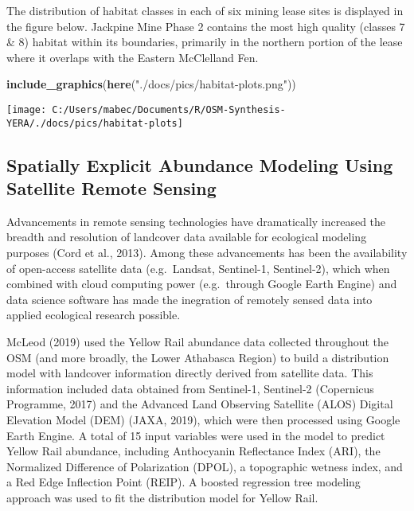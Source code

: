 \documentclass[11pt,]{article}
\newenvironment{Shaded}{\begin{snugshade}}{\end{snugshade}}
\newcommand{\KeywordTok}[1]{\textcolor[rgb]{0.13,0.29,0.53}{\textbf{#1}}}
\newcommand{\StringTok}[1]{\textcolor[rgb]{0.31,0.60,0.02}{#1}}
\newcommand{\NormalTok}[1]{#1}
\begin{document}
The distribution of habitat classes in each of six mining lease sites is
displayed in the figure below. Jackpine Mine Phase 2 contains the most
high quality (classes 7 \& 8) habitat within its boundaries, primarily
in the northern portion of the lease where it overlaps with the Eastern
McClelland Fen.

\begin{Shaded}
\begin{Highlighting}[]
\KeywordTok{include_graphics}\NormalTok{(}\KeywordTok{here}\NormalTok{(}\StringTok{"./docs/pics/habitat-plots.png"}\NormalTok{))}
\end{Highlighting}
\end{Shaded}

\begin{center}\texttt{[image: C:/Users/mabec/Documents/R/OSM-Synthesis-YERA/./docs/pics/habitat-plots]} \end{center}

\subsection{Spatially Explicit Abundance Modeling Using Satellite Remote
Sensing}\label{spatially-explicit-abundance-modeling-using-satellite-remote-sensing}

Advancements in remote sensing technologies have dramatically increased
the breadth and resolution of landcover data available for ecological
modeling purposes (Cord et al., 2013). Among these advancements has been
the availability of open-access satellite data (e.g.~Landsat,
Sentinel-1, Sentinel-2), which when combined with cloud computing power
(e.g.~through Google Earth Engine) and data science software has made
the inegration of remotely sensed data into applied ecological research
possible.

McLeod (2019) used the Yellow Rail abundance data collected throughout
the OSM (and more broadly, the Lower Athabasca Region) to build a
distribution model with landcover information directly derived from
satellite data. This information included data obtained from Sentinel-1,
Sentinel-2 (Copernicus Programme, 2017) and the Advanced Land Observing
Satellite (ALOS) Digital Elevation Model (DEM) (JAXA, 2019), which were
then processed using Google Earth Engine. A total of 15 input variables
were used in the model to predict Yellow Rail abundance, including
Anthocyanin Reflectance Index (ARI), the Normalized Difference of
Polarization (DPOL), a topographic wetness index, and a Red Edge
Inflection Point (REIP). A boosted regression tree modeling approach was
used to fit the distribution model for Yellow Rail.
\end{document}
